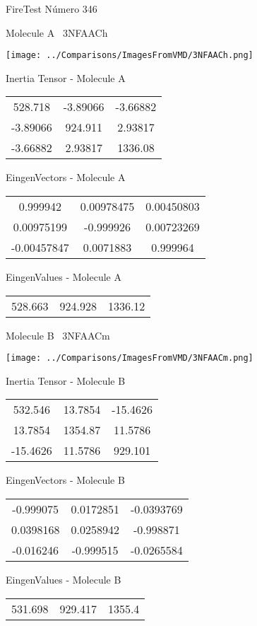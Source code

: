 \vtab[-3cm]
\begin{center}
{\large FireTest \tab Número 346}
\end{center}
\begin{multicols}{2}
\begin{center}

Molecule A \
3NFAACh

\texttt{[image: ../Comparisons/ImagesFromVMD/3NFAACh.png]}

Inertia Tensor - Molecule A \\
\begin{tabular}{|c c c|}
528.718	 & 	-3.89066	 & 	-3.66882	 \\
-3.89066	 & 	924.911	 & 	2.93817	 \\
-3.66882	 & 	2.93817	 & 	1336.08
\end{tabular}

\vtab
 EingenVectors - Molecule A     \\
\begin{tabular}{|c c c|}
0.999942	 & 	0.00978475	 & 	0.00450803	 \\
0.00975199	 & 	-0.999926	 & 	0.00723269	 \\
-0.00457847	 & 	0.0071883	 & 	0.999964
\end{tabular}

\vtab
 EingenValues - Molecule A     \\
\begin{tabular}{|c c c|}
528.663	 & 	924.928	 & 	1336.12	 \\
\end{tabular}
\columnbreak

Molecule B \
3NFAACm

\texttt{[image: ../Comparisons/ImagesFromVMD/3NFAACm.png]}

Inertia Tensor - Molecule B \\
\begin{tabular}{|c c c|}
532.546	 & 	13.7854	 & 	-15.4626	 \\
13.7854	 & 	1354.87	 & 	11.5786	 \\
-15.4626	 & 	11.5786	 & 	929.101
\end{tabular}

\vtab
 EingenVectors - Molecule B     \\
\begin{tabular}{|c c c|}
-0.999075	 & 	0.0172851	 & 	-0.0393769	 \\
0.0398168	 & 	0.0258942	 & 	-0.998871	 \\
-0.016246	 & 	-0.999515	 & 	-0.0265584
\end{tabular}

\vtab
 EingenValues - Molecule B     \\
\begin{tabular}{|c c c|}
531.698	 & 	929.417	 & 	1355.4	 \\
\end{tabular}

\end{center}
\end{multicols}

